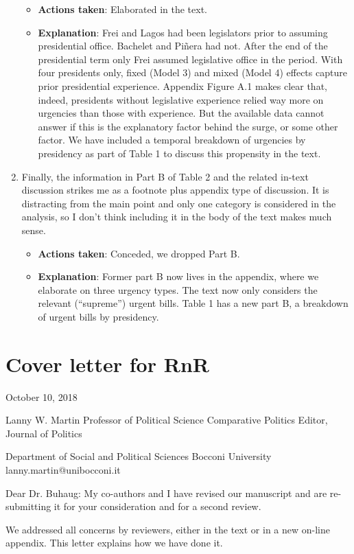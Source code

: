 \documentclass[article,letterpaper,times,12pt,listings-bw,microtype]{article}
\begin{document}
\begin{enumerate}
\begin{itemize}
\item \textbf{Actions taken}: Elaborated in the text.
\item \textbf{Explanation}: Frei and Lagos had been legislators prior to assuming presidential office. Bachelet and Piñera had not. After the end of the presidential term only Frei assumed legislative office in the period. With four presidents only, fixed (Model 3) and mixed (Model 4) effects capture prior presidential experience. Appendix Figure A.1 makes clear that, indeed, presidents without legislative experience relied way more on urgencies than those with experience. But the available data cannot answer if this is the explanatory factor behind the surge, or some other factor. We have included a temporal breakdown of urgencies by presidency as part of Table 1 to discuss this propensity in the text.
\end{itemize}
\item Finally, the information in Part B of Table 2 and the related in-text discussion strikes me as a footnote plus appendix type of discussion. It is distracting from the main point and only one category is considered in the analysis, so I don't think including it in the body of the text makes much sense.
\label{sec:org121a342}
\begin{itemize}
\item \textbf{Actions taken}: Conceded, we dropped Part B.
\item \textbf{Explanation}: Former part B now lives in the appendix, where we elaborate on three urgency types. The text now only considers the relevant (``supreme'') urgent bills. Table 1 has a new part B, a breakdown of urgent bills by presidency.
\end{itemize}
\end{enumerate}
\section{Cover letter for RnR}
\label{sec:orgf3fbbd7}
October 10, 2018

Lanny W. Martin
Professor of Political Science
Comparative Politics Editor, Journal of Politics

Department of Social and Political Sciences
Bocconi University
lanny.martin@unibocconi.it

Dear Dr. Buhaug: My co-authors and I have revised our manuscript and are re-submitting it for your consideration and for a second review. 

We addressed all concerns by reviewers, either in the text or in a new on-line appendix. This letter explains how we have done it. 
\end{document}
